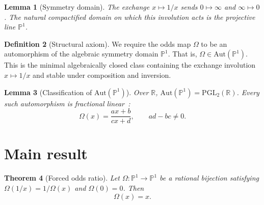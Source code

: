 \documentclass[twocolumn]{iopjournal}
\newtheorem{lemma}{Lemma}
\newtheorem{theorem}[lemma]{Theorem}
\theoremstyle{definition}
\newtheorem{definition}[lemma]{Definition}
\begin{document}
\begin{lemma}[Symmetry domain]
\label{lem:domain}
The exchange $x \mapsto 1/x$ sends $0 \mapsto \infty$ and
$\infty \mapsto 0$.  The natural compactified domain on which
this involution acts is the projective line $\mathbb{P}^1$.
\end{lemma}

\begin{definition}[Structural axiom]
\label{def:axiom}
We require the odds map $\Omega$ to be an automorphism of the
algebraic symmetry domain $\mathbb{P}^1$.  That is,
$\Omega \in \mathrm{Aut}(\mathbb{P}^1)$.  This is the minimal
algebraically closed class containing the exchange involution
$x \mapsto 1/x$ and stable under composition and inversion.
\end{definition}

\begin{lemma}[Classification of $\mathrm{Aut}(\mathbb{P}^1)$]
\label{lem:classification}
Over $\mathbb{R}$,
$\mathrm{Aut}(\mathbb{P}^1) = \mathrm{PGL}_2(\mathbb{R})$.
Every such automorphism is fractional
linear~\cite{Hartshorne1977}:
\begin{equation}
  \Omega(x) = \frac{ax + b}{cx + d}, \qquad ad - bc \neq 0.
  \label{eq:mobius_general}
\end{equation}
\end{lemma}


\section*{Main result}

\begin{theorem}[Forced odds ratio]
\label{thm:forced}
Let $\Omega: \mathbb{P}^1 \to \mathbb{P}^1$ be a rational
bijection satisfying $\Omega(1/x) = 1/\Omega(x)$ and
$\Omega(0) = 0$.  Then
\begin{equation}
  \boxed{\Omega(x) = x.}
  \label{eq:odds_result}
\end{equation}
\end{theorem}
\end{document}
